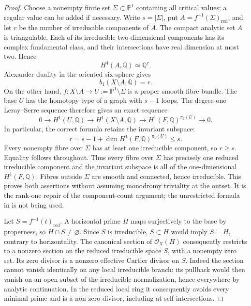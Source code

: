 \begin{proof}
Choose a nonempty finite set $\Sigma\subset\mathbb P^1$ containing
all critical values; a regular value can be added if necessary.
Write $s=|\Sigma|$, put $A=f^{-1}(\Sigma)_{\mathrm{red}}$,
and let $r$ be the number of irreducible components of $A$.
The compact analytic set $A$ is triangulable.  Each of its
irreducible two-dimensional components has its complex
fundamental class, and their intersections have real dimension
at most two.  Hence
\[
 H^4(A,\mathbb Q)\simeq\mathbb Q^r.
\]
Alexander duality in the oriented six-sphere gives
\[
 b_1(X\setminus A,\mathbb Q)=r.
\]
On the other hand, $f:X\setminus A\to U:=\mathbb P^1\setminus\Sigma$
is a proper smooth fibre bundle.  The base $U$ has the homotopy
type of a graph with $s-1$ loops.  The degree-one Leray--Serre
sequence therefore gives an exact sequence
\[
 0\longrightarrow H^1(U,\mathbb Q)
 \longrightarrow H^1(X\setminus A,\mathbb Q)
 \longrightarrow H^1(F,\mathbb Q)^{\pi_1(U)}
 \longrightarrow0.
\]
In particular, the correct formula retains the invariant
subspace:
\[
 r=s-1+\dim H^1(F,\mathbb Q)^{\pi_1(U)}\le s.
\]
Every nonempty fibre over $\Sigma$ has at least one irreducible
component, so $r\ge s$.  Equality follows throughout.  Thus
every fibre over $\Sigma$ has precisely one reduced irreducible
component and the invariant subspace is all of the
one-dimensional $H^1(F,\mathbb Q)$.  Fibres outside $\Sigma$ are
smooth and connected, hence irreducible.  This proves both
assertions without assuming monodromy triviality at the outset.
It is the rank-one repair of the component-count argument;
the unrestricted formula in \citet[Lemma~4.2]{CDP2020D} is not
being used.

Let $S=f^{-1}(t)_{\mathrm{red}}$.  A horizontal prime $H$ maps
surjectively to the base by properness, so $H\cap S\ne\varnothing$.
Since $S$ is irreducible, $S\subset H$ would imply $S=H$,
contrary to horizontality.  The canonical section of
$\mathcal O_X(H)$ consequently restricts to a nonzero section
on the reduced irreducible space $S$, with a nonempty zero
set.  Its zero divisor is a nonzero effective Cartier divisor
on $S$.  Indeed the section cannot vanish identically on
any local irreducible branch: its pullback would then vanish
on an open subset of the irreducible normalization, hence
everywhere by analytic continuation.  In the reduced local
ring it consequently avoids every minimal prime and is a
non-zero-divisor, including at self-intersections.


\end{proof}
